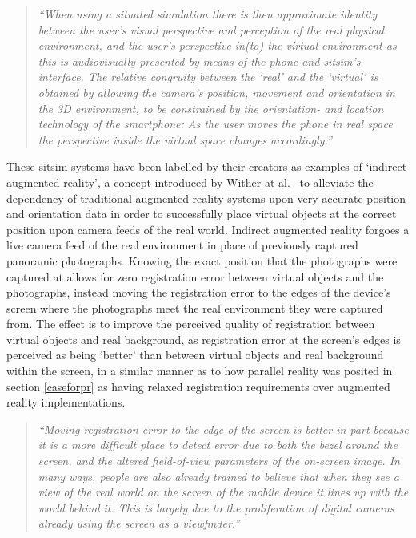 \begin{quote}
	\textit{``When using a situated simulation there is then approximate identity between the user’s visual perspective and perception of the real physical environment, and the user’s perspective in(to) the virtual environment as this is audiovisually presented by means of the phone and sitsim’s interface. The relative congruity between the `real' and the `virtual' is obtained by allowing the camera’s position, movement and orientation in the 3D environment, to be constrained by the orientation- and location technology of the smartphone: As the user moves the phone in real space the perspective inside the virtual space changes accordingly.''}~\cite{Liestøl2011}
\end{quote}

These sitsim systems have been labelled by their creators as examples of `indirect augmented reality', a concept introduced by Wither at al.~\cite{Wither2011} to alleviate the dependency of traditional augmented reality systems upon very accurate position and orientation data in order to successfully place virtual objects at the correct position upon camera feeds of the real world. Indirect augmented reality forgoes a live camera feed of the real environment in place of previously captured panoramic photographs. Knowing the exact position that the photographs were captured at allows for zero registration error between virtual objects and the photographs, instead moving the registration error to the edges of the device's screen where the photographs meet the real environment they were captured from. The effect is to improve the perceived quality of registration between virtual objects and real background, as registration error at the screen's edges is perceived as being `better' than between virtual objects and real background within the screen, in a similar manner as to how parallel reality was posited in section \ref{caseforpr} as having relaxed registration requirements over augmented reality implementations.

\begin{quote}
	\textit{``Moving registration error to the edge of the screen is better in part because it is a more difficult place to detect error due to both the bezel around the screen, and the altered field-of-view parameters of the on-screen image. In many ways, people are also already trained to believe that when they see a view of the real world on the screen of the mobile device it lines up with the world behind it. This is largely due to the proliferation of digital cameras already using the screen as a viewfinder.''}~\cite{Wither2011}
\end{quote}

